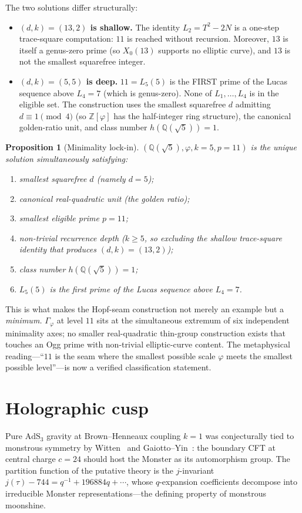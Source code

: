 \documentclass[11pt,a4paper]{article}
\theoremstyle{plain}
\newtheorem{proposition}[theorem]{Proposition}
\theoremstyle{definition}
\theoremstyle{remark}
\numberwithin{equation}{section}
\providecommand{\Zp}{\ensuremath{\mathbb{Z}[\varphi]}}
\providecommand{\Qp}{\ensuremath{\mathbb{Q}(\sqrt{5})}}
\providecommand{\Gphi}{\ensuremath{\Gamma_{\varphi}}}
\begin{document}
The two solutions differ structurally:

\begin{itemize}
\item \textbf{$(d,k)=(13,2)$ is shallow.}  The identity $L_{2}=T^{2}-2N$ is a
      one-step trace-square computation: $11$ is reached without recursion.
      Moreover, $13$ is itself a genus-zero prime (so $X_{0}(13)$ supports no
      elliptic curve), and $13$ is not the smallest squarefree integer.
\item \textbf{$(d,k)=(5,5)$ is deep.}  $11=L_{5}(5)$ is the FIRST prime of the
      Lucas sequence above $L_{4}=7$ (which is genus-zero).  None of
      $L_{1},\ldots,L_{4}$ is in the eligible set.  The construction uses the
      smallest squarefree $d$ admitting $d\equiv 1\pmod{4}$ (so $\Zp$ has the
      half-integer ring structure), the canonical golden-ratio unit, and class
      number $h(\Qp)=1$.
\end{itemize}

\begin{proposition}[Minimality lock-in]\label{prop:phi-lock-in}
  $(\Qp,\varphi,k=5,p=11)$ is the unique solution simultaneously satisfying:
  \begin{enumerate}
  \item smallest squarefree $d$ (namely $d=5$);
  \item canonical real-quadratic unit (the golden ratio);
  \item smallest eligible prime $p=11$;
  \item non-trivial recurrence depth ($k\ge 5$, so excluding the shallow trace-square
        identity that produces $(d,k)=(13,2)$);
  \item class number $h(\Qp)=1$;
  \item $L_{5}(5)$ is the first prime of the Lucas sequence above $L_{4}=7$.
  \end{enumerate}
\end{proposition}

This is what makes the Hopf-seam construction not merely an example but a
\emph{minimum.}  $\Gphi$ at level $11$ sits at the simultaneous extremum of six
independent minimality axes; no smaller real-quadratic thin-group construction
exists that touches an Ogg prime with non-trivial elliptic-curve content.
The metaphysical reading---``$11$ is the seam where the smallest possible scale
$\varphi$ meets the smallest possible level''---is now a verified
classification statement.

\section{Holographic cusp}
\label{sec:holographic-cusp}
Pure $\mathrm{AdS}_{3}$ gravity at Brown--Henneaux coupling $k=1$ was
conjecturally tied to monstrous symmetry by
Witten~\cite{Witten07} and Gaiotto--Yin~\cite{GaiottoYin}: the boundary
CFT at central charge $c=24$ should host the Monster as its automorphism
group.  The partition function of the putative theory is the
$j$-invariant $j(\tau)-744 = q^{-1}+196884q+\cdots$, whose
$q$-expansion coefficients decompose into irreducible Monster
representations---the defining property of monstrous moonshine.
\end{document}
